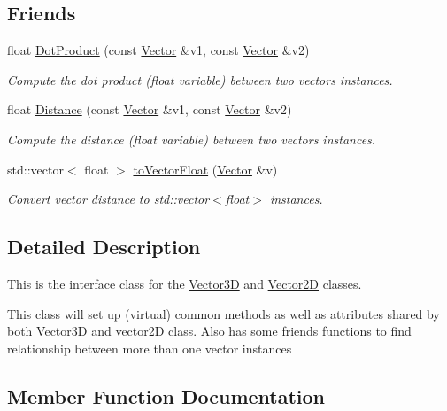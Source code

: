 \subsection*{Friends}
\begin{DoxyCompactItemize}
\item 
float \hyperlink{classcsci3081_1_1Vector_ae3bcd7cf17dbea6b1f935534c69ca0f0}{Dot\+Product} (const \hyperlink{classcsci3081_1_1Vector}{Vector} \&v1, const \hyperlink{classcsci3081_1_1Vector}{Vector} \&v2)
\begin{DoxyCompactList}\small\item\em Compute the dot product (float variable) between two vectors instances. \end{DoxyCompactList}\item 
float \hyperlink{classcsci3081_1_1Vector_acd23c5473c105b42b0656eaa0ffa02d2}{Distance} (const \hyperlink{classcsci3081_1_1Vector}{Vector} \&v1, const \hyperlink{classcsci3081_1_1Vector}{Vector} \&v2)
\begin{DoxyCompactList}\small\item\em Compute the distance (float variable) between two vectors instances. \end{DoxyCompactList}\item 
std\+::vector$<$ float $>$ \hyperlink{classcsci3081_1_1Vector_a7647fb9682b28785ce754fa445a2d365}{to\+Vector\+Float} (\hyperlink{classcsci3081_1_1Vector}{Vector} \&v)
\begin{DoxyCompactList}\small\item\em Convert vector distance to std\+::vector$<$float$>$ instances. \end{DoxyCompactList}\end{DoxyCompactItemize}


\subsection{Detailed Description}
This is the interface class for the \hyperlink{classcsci3081_1_1Vector3D}{Vector3D} and \hyperlink{classcsci3081_1_1Vector2D}{Vector2D} classes. 

This class will set up (virtual) common methods as well as attributes shared by both \hyperlink{classcsci3081_1_1Vector3D}{Vector3D} and vector2D class. Also has some friends functions to find relationship between more than one vector instances 

\subsection{Member Function Documentation}
\mbox{\label{classcsci3081_1_1Vector_a0ce4762325d81521ba1e1a1f6ee1a171}} 
